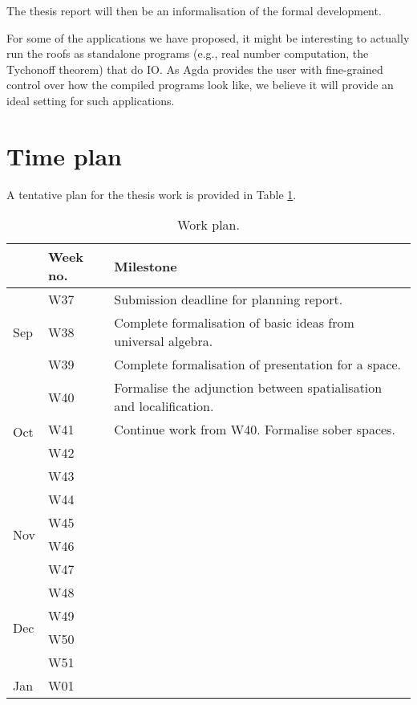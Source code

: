 \documentclass{article}
\begin{document}
The thesis report will then be an informalisation of the formal development.

For some of the applications we have proposed, it might be interesting to actually run the
roofs as standalone programs (e.g., real number computation, the Tychonoff theorem) that
do IO. As Agda provides the user with fine-grained control over how the compiled programs
look like, we believe it will provide an ideal setting for such applications.

\section{Time plan}

A tentative plan for the thesis work is provided in Table \ref{table:plan}.

\begin{table}[]\caption{Work plan.}\label{table:plan}
\begin{tabular}{lll}
&      Week no. & Milestone                                                                  \\\hline
\multirow{3}{*}{Sep} & W37  & Submission deadline for planning report. \\
                     & W38  & Complete formalisation of basic ideas from universal algebra. \\
                     & W39  & Complete formalisation of presentation for a space. \\ \hline
\multirow{4}{*}{Oct} & W40  & Formalise the adjunction between spatialisation and localification. \\
                     & W41  & Continue work from W40. Formalise sober spaces. \\
                     & W42  & \\
                     & W43  & \\ \hline
\multirow{4}{*}{Nov} & W44  & \\
                     & W45  & \\
                     & W46  & \\
                     & W47  & \\ \hline
\multirow{4}{*}{Dec} & W48  & \\
                     & W49  & \\
                     & W50  & \\
                     & W51  & \\ \hline
\multirow{4}{*}{Jan} & W01  & \\

\end{tabular}
\end{table}
\end{document}
